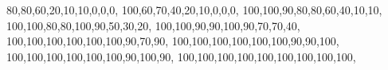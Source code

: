 {80,80,60,20,10,10,0,0,0},
{100,60,70,40,20,10,0,0,0},
{100,100,90,80,80,60,40,10,10},
{100,100,80,80,100,90,50,30,20},
{100,100,90,90,100,90,70,70,40},
{100,100,100,100,100,100,90,70,90},
{100,100,100,100,100,100,90,90,100},
{100,100,100,100,100,100,90,100,90},
{100,100,100,100,100,100,100,100,100},
